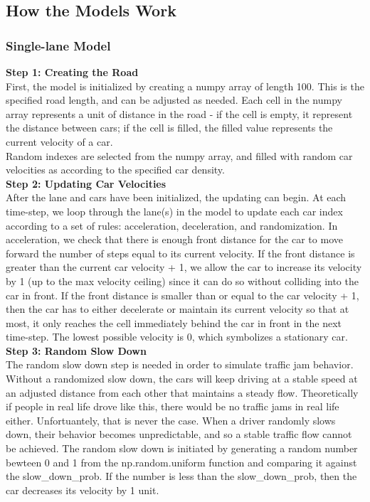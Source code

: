 \documentclass[11pt]{article}
\begin{document}
    \subsection{How the Models Work}

\subsubsection{Single-lane Model}

\textbf{Step 1: Creating the Road}\\

First, the model is initialized by creating a numpy array of length 100.
This is the specified road length, and can be adjusted as needed. Each
cell in the numpy array represents a unit of distance in the road - if
the cell is empty, it represent the distance between cars; if the cell
is filled, the filled value represents the current velocity of a car.\\

Random indexes are selected from the numpy array, and filled with random
car velocities as according to the specified car density.\\

\textbf{Step 2: Updating Car Velocities}\\

After the lane and cars have been initialized, the updating can begin.
At each time-step, we loop through the lane(s) in the model to update
each car index according to a set of rules: acceleration, deceleration,
and randomization. In acceleration, we check that there is enough front
distance for the car to move forward the number of steps equal to its
current velocity. If the front distance is greater than the current car
velocity + 1, we allow the car to increase its velocity by 1 (up to the
max velocity ceiling) since it can do so without colliding into the car
in front. If the front distance is smaller than or equal to the car
velocity + 1, then the car has to either decelerate or maintain its
current velocity so that at most, it only reaches the cell immediately
behind the car in front in the next time-step. The lowest possible
velocity is 0, which symbolizes a stationary car.\\

\textbf{Step 3: Random Slow Down}\\

The random slow down step is needed in order to simulate traffic jam
behavior. Without a randomized slow down, the cars will keep driving at
a stable speed at an adjusted distance from each other that maintains a
steady flow. Theoretically if people in real life drove like this, there
would be no traffic jams in real life either. Unfortuantely, that is
never the case. When a driver randomly slows down, their behavior
becomes unpredictable, and so a stable traffic flow cannot be achieved.
The random slow down is initiated by generating a random number bewteen
0 and 1 from the np.random.uniform function and comparing it against the
slow\_down\_prob. If the number is less than the slow\_down\_prob, then
the car decreases its velocity by 1 unit.
\end{document}
